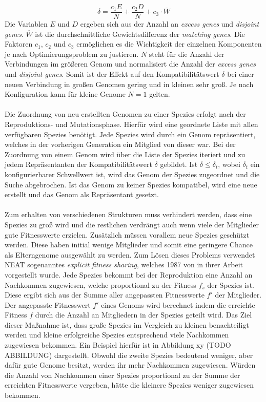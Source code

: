 $$\delta=\frac{c_1E}{N}+\frac{c_2D}{N}+c_3 \cdot \overline{W}$$
Die Variablen $E$ und $D$ ergeben sich aus der Anzahl an \emph{excess genes} und \emph{disjoint genes}. $\overline{W}$ ist die durchschnittliche Gewichtsdifferenz der \emph{matching genes}. Die Faktoren $c_1$, $c_2$ und $c_3$ ermöglichen es die Wichtigkeit der einzelnen Komponenten je nach Optimierungsproblem zu justieren. $N$ steht für die Anzahl der Verbindungen im größeren Genom und normalisiert die Anzahl der \emph{excess genes} und \emph{disjoint genes}. Somit ist der Effekt auf den Kompatibilitätswert $\delta$ bei einer neuen Verbindung in großen Genomen gering und in kleinen sehr groß. Je nach Konfiguration kann für kleine Genome $N=1$ gelten.
\\\\
Die Zuordnung von neu erstellten Genomen zu einer Spezies erfolgt nach der Reproduktions- und Mutationsphase. Hierfür wird eine geordnete Liste mit allen verfügbaren Spezies benötigt. Jede Spezies wird durch ein Genom repräsentiert, welches in der vorherigen Generation ein Mitglied von dieser war. Bei der Zuordnung von einem Genom wird über die Liste der Spezies iteriert und zu jedem Repräsentanten der Kompatibilitätswert $\delta$ gebildet. Ist $\delta \leq \delta_t$, wobei $\delta_t$ ein konfigurierbarer Schwellwert ist, wird das Genom der Spezies zugeordnet und die Suche abgebrochen. Ist das Genom zu keiner Spezies kompatibel, wird eine neue erstellt und das Genom als Repräsentant gesetzt.
\\\\
Zum erhalten von verschiedenen Strukturen muss verhindert werden, dass eine Spezies zu groß wird und die restlichen verdrängt auch wenn viele der Mitglieder gute Fitnesswerte erzielen. Zusätzlich müssen vorallem neue Spezies geschützt werden. Diese haben initial wenige Mitglieder und somit eine geringere Chance als Elterngenome ausgewählt zu werden. Zum Lösen dieses Problems verwendet \ac{NEAT} sogenanntes \emph{explicit fitness sharing}, welches 1987 von \citeauthor{goldberg1987genetic} in ihrer Arbeit \cite{goldberg1987genetic} vorgestellt wurde. Jede Spezies bekommt bei der Reproduktion eine Anzahl an Nachkommen zugewiesen, welche proportional zu der Fitness $f_{s}$ der Spezies ist. Diese ergibt sich aus der Summe aller angepassten Fitnesswerte $f'$ der Mitglieder. Der angepasste Fitnesswert $f'$ eines Genoms wird berechnet indem die erreichte Fitness $f$ durch die Anzahl an Mitgliedern in der Spezies geteilt wird. Das Ziel dieser Maßnahme ist, dass große Spezies im Vergleich zu kleinen benachteiligt werden und kleine erfolgreiche Spezies entsprechend viele Nachkommen zugewiesen bekommen. Ein Beispiel hierfür ist in Abbildung xy (TODO ABBILDUNG) dargestellt. Obwohl die zweite Spezies bedeutend weniger, aber dafür gute Genome besitzt, werden ihr mehr Nachkommen zugewiesen. Würden die Anzahl von Nachkommen einer Spezies proportional zu der Summe der erreichten Fitnesswerte vergeben, hätte die kleinere Spezies weniger zugewiesen bekommen. 
